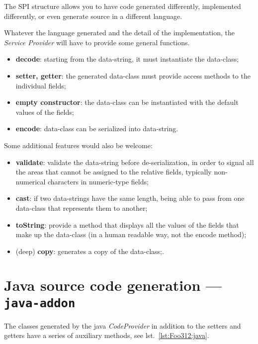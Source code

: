 \documentclass[a4paper,10pt]{report}
\begin{document}
The SPI structure allows you to have code generated differently, implemented 
differently, or even generate source in a different language.

Whatever the language generated and the detail of the implementation, the 
\textsl{Service Provider} will have to provide some general functions.

\begin{itemize}\setlength\itemsep{-0.5ex}
\item \textbf{decode}: starting from the data-string, it must instantiate the 
    data-class;
\item \textbf{setter, getter}: the generated data-class must provide access 
    methods to the individual fields;
\item \textbf{empty constructor}: the data-class can be instantiated with the 
    default values of the fields;
\item \textbf{encode}: data-class can be serialized into data-string.
\end{itemize}
Some additional features would also be welcome:
\begin{itemize}\setlength\itemsep{-0.5ex}
\item \textbf{validate}: validate the data-string before de-serialization, in 
    order to signal all the areas that cannot be assigned to the relative 
    fields, typically non-numerical characters in numeric-type fields;
\item \textbf{cast}: if two data-strings have the same length, being able to 
    pass from one data-class that represents them to another;
\item \textbf{toString}: provide a method that displays all the values of the 
    fields that make up the data-class (in a human readable way, not the encode 
    method);
\item (deep) \textbf{copy}: generates a copy of the data-class;.
\end{itemize}

\section{Java source code generation --- \texttt{java-addon}} 
\label{sec:java.addon}
The classes generated by the java \textsl{CodeProvider} in addition to the 
setters and getters have a series of auxiliary methods, see 
lst.~\ref{lst:Foo312:java}.
\end{document}
